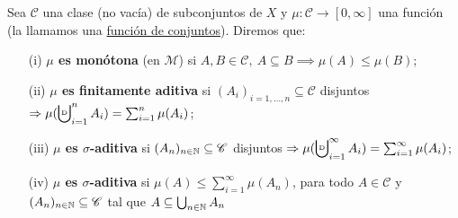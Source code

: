 \documentclass[a4paper]{report}
\newcommand{\bigcupd}{\mathop{\ensurestackMath{\stackinset{l}{}{c}{+.25ex}{\hspace{3pt}{\text{\tiny{D}}}}{\displaystyle{\bigcup}}}}}
\begin{document}
	\begin{definition}
		Sea $\mathscr{C}$ una clase (no vacía) de subconjuntos de $X$ y $\mu : \mathscr{C} \to [0,\infty]$ una función (la llamamos una \underline{función de conjuntos}). Diremos que:
		\begin{enumerate}
			\item[(i)] \textbf{$\mu$ es monótona} (en $\mathscr{M}$) si $A,B\in\mathscr{C},\ A \subseteq B \implies \mu(A)\leq\mu(B)$;

			\item[(ii)] \textbf{$\mu$ es finitamente aditiva} si $(A_i)_{i=1,\dots,n} \subseteq \mathscr{C}$ disjuntos $\implies \mu(\bigcupd_{i=1}^{n} A_i) = \sum_{i=1}^{n} \mu(A_i)$;

			\item[(iii)] \textbf{$\mu$ es $\sigma$-aditiva} si $(A_n)_{n\in\mathbb{N}} \subseteq \mathscr{C}$ disjuntos $\implies \mu (\bigcupd_{i=1}^{\infty} A_i ) = \sum_{i=1}^{\infty} \mu(A_i)$;

			\item[(iv)] \textbf{$\mu$ es $\sigma$-aditiva} si $\mu(A)\leq \sum_{i=1}^{\infty}\mu(A_n)$, para todo $A \in \mathscr{C}$ y $(A_n)_{n\in\mathbb{N}}\subseteq\mathscr{C}$ tal que $A \subseteq \bigcup_{n\in\mathbb{N}} A_n$
		\end{enumerate}
	\end{definition}



\end{document}

